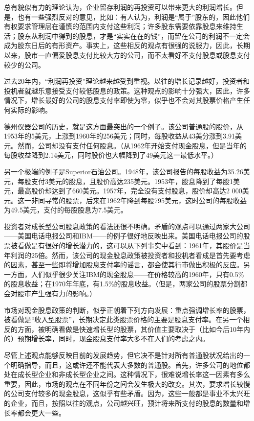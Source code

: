 \documentclass[12pt,oneside]{book}
\begin{document}
总有貌似有力的理论认为，企业留存利润的再投资可以带来更大的利润增长。但是，也有一些强烈反对的意见，比如：有人认为，利润是“属于”股东的，因此他们有权要求管理层在谨慎的范围内支付这些利润；许多股东需要依靠股息来维持生活；股东从利润中得到的股息，才是“实实在在的钱”，而留在公司的利润不一定会成为股东日后的有形资产。事实上，这些相反的观点有很强的说服力，因此，长期以来，股市一直偏爱股息支付比较大方的公司，而不太看好不支付股息或股息支付较少的公司。

过去20年内，“利润再投资”理论越来越受到重视。以往的增长记录越好，投资者和投机者就越乐意接受支付较低股息的政策。这种观点的影响十分强大，因此，许多情况下，增长最好的公司的股息支付率即使为零，似乎也不会对其股票价格产生任何实际的影响。

德州仪器公司的历史，就是这方面最突出的一个例子。该公司普通股的股价，从1953年的5美元，上涨到1960年的256美元；同时，每股收益从43美分涨到3.91美元。然而，公司却没有支付任何股息。（从1962年开始支付现金股息，但是当年的每股收益降到2.14美元，同时股价也大幅降到了49美元这一最低水平。）

另一个极端的例子是Superior石油公司。1948年，该公司报告的每股收益为35.26美元，每股支付3美元的股息，且股价高达235美元。1953年，股息降到了每股1美元，最高股价却达到了660美元。1957年，完全没有支付股息，股价却高达2 000美元。这一非同寻常的股票，后来在1962年降到每股795美元，这时公司的每股收益为49.5美元，支付的每股股息为7.5美元。

投资者对成长型公司股息政策的看法还很不明确。矛盾的观点可以通过两家大公司——美国电话电报公司和IBM——的例子很好地反映出来。美国电话电报公司的股票被看做是有很好的增长潜力的，这可以从下列事实中看到：1961年，其股价是当年利润的25倍。然而，该公司的现金股息政策被投资者和投机者看成是首先要考虑的因素，甚至一些即将增加股息支付率的谣言，都会使其行市做出积极的反应。另一方面，人们似乎很少关注IBM的现金股息——在价格较高的1960年，只有0.5\%的股息收益；在1970年年底，有1.5\%的股息收益。（但是，两家公司的股票分割都会对股市产生强有力的影响。）

市场对现金股息政策的判断，似乎正朝着下列方向发展：重点强调增长率的股票，被看做是“收入型股票”，长期决定此类股票价格的主要是股息支付率。在另一个相反的方面，被明确看做是快速增长型的股票，其价值主要取决于（比如今后10年内的）预期增长率，同时，现金股息支付率大多不在人们的考虑之内。

尽管上述观点能够反映目前的发展趋势，但它决不是针对所有普通股状况给出的一个明确指导，而且，这或许还不能代表大多数的普通股。首先，许多公司的地位都处在成长型企业和非成长型企业之间。这种情况下，很难说增长率这一因素有多么重要，因此，市场的观点在不同年份之间会发生极大的改变。其次，要求增长较慢的公司支付较多的现金股息，这似乎有些矛盾。因为，这些一般都是事业不太兴旺的企业，而且，按照以往的观点，公司越兴旺，预计将来所支付的股息的数量和增长率都会更大一些。
\end{document}
